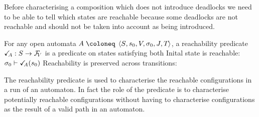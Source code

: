 \documentclass{article}
\begin{document}
Before characterising a composition which does not introduce deadlocks we need to be able to tell which states are reachable because some deadlocks are not reachable and should not be taken into account as being introduced.
\begin{defi}[Reachability]
For any open automata \(A \defobject \OAg\), a reachability predicate \(\reach{A}: S \to \rformulas[V]\) is a predicate on states satisfying both
 Inital state is reachable: \(\sigma_0 \vdash \reach{A}\mpar{s_0}\)
 Reachability is preserved across transitions: 
\end{defi}
The reachability predicate is used to characterise the reachable configurations in a run of an automaton.
In fact the role of the predicate is to characterise potentially reachable configurations without having to characterise configurations as the result of a valid path in an automaton.
\end{document}
